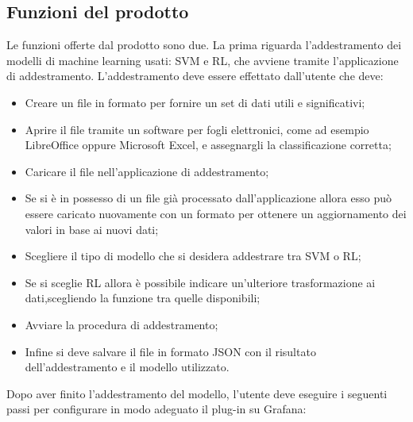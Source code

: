 \documentclass[../analisi-dei-requisiti.tex]{subfiles}
\begin{document}
\subsection{Funzioni del prodotto}
\label{subs:funzioni_del_prodotto}
	Le funzioni offerte dal prodotto sono due.
	La prima riguarda l'addestramento dei modelli di machine learning usati: SVM e RL, che avviene tramite l'applicazione di addestramento. L'addestramento deve essere effettato dall'utente che deve:
	\begin{itemize}
		\item{Creare un file in formato  per fornire un set di dati utili e significativi;}
		\item{Aprire il file tramite un software per fogli elettronici, come ad esempio LibreOffice oppure Microsoft Excel, e assegnargli la classificazione corretta;}
		\item{Caricare il file nell'applicazione di addestramento;}
		\item{Se si è in possesso di un file già processato dall'applicazione allora esso può essere caricato nuovamente con un formato  per ottenere un aggiornamento dei valori in base ai nuovi dati;}
		\item{Scegliere il tipo di modello che si desidera addestrare tra SVM o RL;}
		\item{Se si sceglie RL allora è possibile indicare un'ulteriore trasformazione ai dati,scegliendo la funzione tra quelle disponibili;}
		\item{Avviare la procedura di addestramento;}
		\item{Infine si deve salvare il file in formato JSON con il risultato dell'addestramento e il modello utilizzato.}
	\end{itemize}
	Dopo aver finito l'addestramento del modello, l'utente deve eseguire i seguenti passi per configurare in modo adeguato il plug-in su Grafana:
\end{document}
